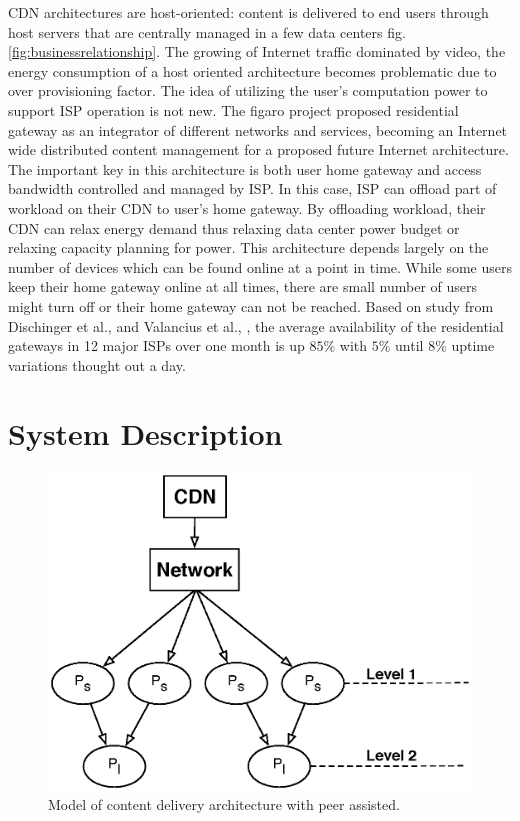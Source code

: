 \documentclass[conference]{IEEEtran}
\begin{document}
CDN architectures are host-oriented: content is delivered to end users through host servers that are centrally managed in a few data centers fig.\ref{fig:businessrelationship}. 
The growing of Internet traffic dominated by video, the energy consumption of a host oriented architecture becomes problematic due to over provisioning factor.
The idea of utilizing the user's computation power to support ISP operation is not new. 
The figaro project proposed residential gateway as an integrator of different networks and services, becoming an Internet wide distributed content management for a proposed future Internet architecture.  
The important key in this architecture is both user home gateway and access bandwidth controlled and managed by ISP.
In this case, ISP can offload part of workload on their CDN to user's home gateway.  
By offloading workload, their CDN can relax energy demand thus relaxing data center power budget or relaxing capacity planning for power.
This architecture depends largely on the number of devices which can be found online at a point in time.
While some users keep their home gateway online at all times, there are small number of users might turn off or their home gateway can not be reached.
Based on study from Dischinger et al., \cite{Dischinger:2007:CRB:1298306.1298313} and Valancius et al., \cite{valancius2009greening}, the average availability of the residential gateways in 12 major ISPs over one month is up $85\%$ with $5\%$ until $8\%$ uptime variations thought out a day.

\section{System Description}\label{system model}
\begin{figure}[thb]
\begin{center}
\includegraphics[scale=0.6]{graphs/p2p-cdn.eps}
\end{center}
\caption{Model of content delivery architecture with peer assisted.}
\label{fig:iptv}
\end{figure} 
\end{document}

